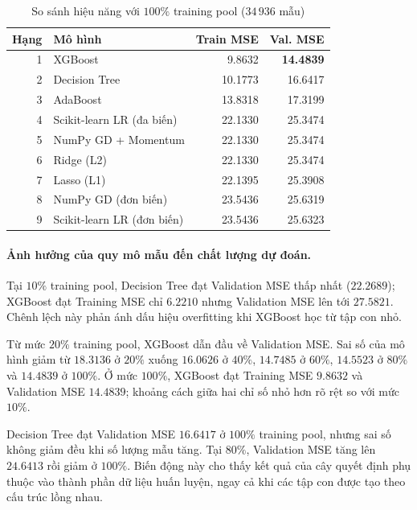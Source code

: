 
\begin{table}[H]
    \centering
    \caption{So sánh hiệu năng với $100\%$ training pool ($34\,936$ mẫu)}
    \label{tab:lc-100}
    \small
    \begin{tabular}{r p{} rr}
        \toprule
        \textbf{Hạng} & \textbf{Mô hình} & \textbf{Train MSE}
        & \textbf{Val. MSE} \\
        \midrule
        1 & XGBoost & 9.8632 & \textbf{14.4839} \\
        2 & Decision Tree & 10.1773 & 16.6417 \\
        3 & AdaBoost & 13.8318 & 17.3199 \\
        4 & Scikit-learn LR (đa biến) & 22.1330 & 25.3474 \\
        5 & NumPy GD + Momentum & 22.1330 & 25.3474 \\
        6 & Ridge (L2) & 22.1330 & 25.3474 \\
        7 & Lasso (L1) & 22.1395 & 25.3908 \\
        8 & NumPy GD (đơn biến) & 23.5436 & 25.6319 \\
        9 & Scikit-learn LR (đơn biến) & 23.5436 & 25.6323 \\
        \bottomrule
    \end{tabular}
\end{table}


\paragraph{Ảnh hưởng của quy mô mẫu đến chất lượng dự đoán.}

Tại $10\%$ training pool, Decision Tree đạt Validation MSE thấp
nhất ($22.2689$); XGBoost đạt Training MSE chỉ $6.2210$ nhưng
Validation MSE lên tới $27.5821$. Chênh lệch này phản ánh dấu
hiệu overfitting khi XGBoost học từ tập con nhỏ.

Từ mức $20\%$ training pool, XGBoost dẫn đầu về Validation MSE.
Sai số của mô hình giảm từ $18.3136$ ở $20\%$ xuống $16.0626$
ở $40\%$, $14.7485$ ở $60\%$, $14.5523$ ở $80\%$
và $14.4839$ ở $100\%$. Ở mức $100\%$, XGBoost đạt
Training MSE $9.8632$ và Validation MSE $14.4839$;
khoảng cách giữa hai chỉ số nhỏ hơn rõ rệt so với mức $10\%$.

Decision Tree đạt Validation MSE $16.6417$ ở $100\%$ training pool,
nhưng sai số không giảm đều khi số lượng mẫu tăng. Tại $80\%$,
Validation MSE tăng lên $24.6413$ rồi giảm ở $100\%$.
Biến động này cho thấy kết quả của cây quyết định phụ thuộc
vào thành phần dữ liệu huấn luyện, ngay cả khi các tập con
được tạo theo cấu trúc lồng nhau.

